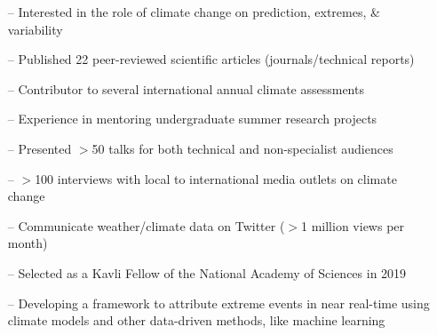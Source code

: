 \documentclass[10pt,a4paper]{altacv}
\begin{document}

%

\begin{fullwidth}
\makecvheader
\end{fullwidth}

%

\vspace{-0.09in}
\begin{itemize}
    \setlength{\itemindent}{0.5em}
    \item[--] \small{Interested in the role of climate change on prediction, extremes, \& variability}
    \item[--] \small{Published 22 peer-reviewed scientific articles (journals/technical reports)}
    \item[--] \small{Contributor to several international annual climate assessments}
    \item[--] \small{Experience in mentoring undergraduate summer research projects}
    \item[--] \small{Presented $>$50 talks for both technical and non-specialist audiences}
    \item[--] \small{$>$100 interviews with local to international media outlets on climate change}
    \item[--] \small{Communicate weather/climate data on Twitter ($>$1 million views per month)}
    \item[--] \small{Selected as a Kavli Fellow of the National Academy of Sciences in 2019}
\end{itemize}
\medskip



\begin{itemize}
    \setlength{\itemindent}{0.5em}
    \item[--]   \small{Developing a framework to attribute extreme events in near real-time using climate models and other data-driven methods, like machine learning}
\end{itemize}
\medskip
\end{document}
